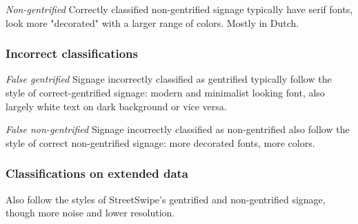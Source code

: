 \textit{Non-gentrified} Correctly classified non-gentrified signage typically have serif fonts, look more "decorated" with a larger range of colors. Mostly in Dutch.

\subsubsection{Incorrect classifications}
\textit{False gentrified} Signage incorrectly classified as gentrified typically follow the style of correct-gentrified signage: modern and minimalist looking font, also largely white text on dark background or vice versa.

\textit{False non-gentrified} Signage incorrectly classified as non-gentrified also follow the style of correct non-gentrified signage: more decorated fonts, more colors.

\subsubsection{Classifications on extended data}
Also follow the styles of StreetSwipe's gentrified and non-gentrified signage, though more noise and lower resolution.





